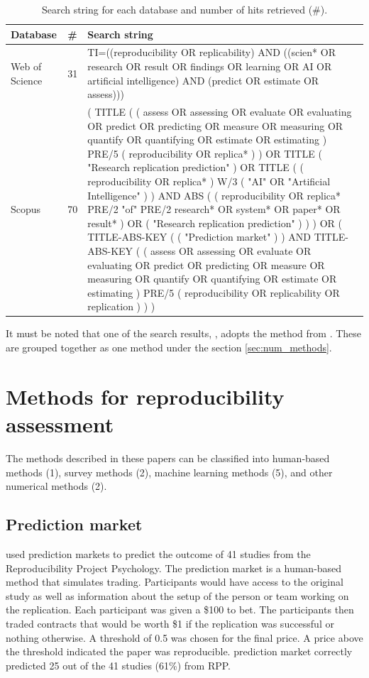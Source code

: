 \documentclass[12pt, a4paper, twocolumn]{article}
\begin{document}
	\begin{table}[htbp]
		\centering
		\caption[Search string for each database]{Search string for each database and number of hits retrieved (\#).}\label{tab:search_string_table}
		\small
			\begin{tabular}{llp{}}
			\hline
			Database & \# & Search string \\ \hline
			Web of Science & 31 & TI=((reproducibility OR replicability) AND ((scien* OR research OR result OR findings OR learning OR AI OR artificial intelligence) AND (predict OR estimate OR assess))) \\ 
			Scopus  & 70 & ( TITLE ( ( assess OR assessing OR evaluate OR evaluating OR predict OR predicting OR measure OR measuring OR quantify OR quantifying OR estimate OR estimating ) PRE/5 ( reproducibility OR replica* ) ) OR TITLE ( "Research replication prediction" ) OR TITLE ( ( reproducibility OR replica* ) W/3 ( "AI" OR "Artificial Intelligence" ) ) AND ABS ( ( reproducibility OR replica* PRE/2 "of" PRE/2 research* OR system* OR paper* OR result* ) OR ( "Research replication prediction" ) ) ) OR ( TITLE-ABS-KEY ( ( "Prediction market" ) )  AND  TITLE-ABS-KEY ( ( assess  OR  assessing  OR  evaluate  OR  evaluating  OR  predict  OR  predicting  OR  measure  OR  measuring  OR  quantify  OR  quantifying  OR  estimate  OR  estimating )  PRE/5  ( reproducibility  OR  replicability  OR  replication ) ) )  \\ \hline
			\end{tabular}
	\end{table} 

		It must be noted that one of the search results, \citet{raghupathi2022Reproducibility}, adopts the method from \citet{gundersen2018state}. These are grouped together as one method under the section \ref{sec:num_methods}.  

	\section{Methods for reproducibility assessment}\label{sec:methods}
	The methods described in these papers can be classified into human-based methods (1), survey methods (2), machine learning methods (5), and other numerical methods (2).

		\subsection{Prediction market}
			\citet{Dreber2015using} used prediction markets to predict the outcome of 41 studies from the Reproducibility Project Psychology. The prediction market is a human-based method that simulates trading. Participants would have access to the original study as well as information about the setup of the person or team working on the replication. Each participant was given a \$100 to bet. The participants then traded contracts that would be worth \$1 if the replication was successful or nothing otherwise. A threshold of 0.5 was chosen for the final price. A price above the threshold indicated the paper was reproducible. \citet{Dreber2015using} prediction market correctly predicted 25 out of the 41 studies (61\%) from RPP.
				
\end{document}

